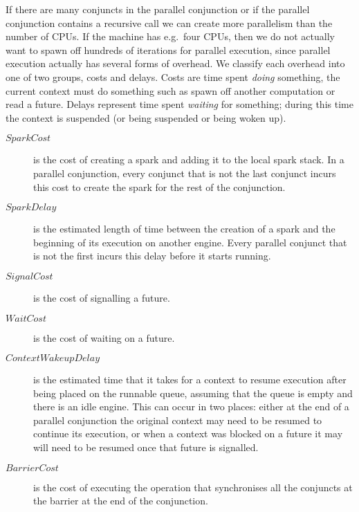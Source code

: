 If there are many conjuncts in the parallel conjunction or if the parallel
conjunction contains a recursive call we can create more parallelism than
the number of CPUs.
If the machine has e.g.\ four CPUs,
then we do not actually want to spawn off
hundreds of iterations for parallel execution,
since parallel execution actually has several forms of overhead.
We classify each overhead into one of two groups, costs and delays.
Costs are time spent \emph{doing} something, the current context must do
something such as spawn off another computation or read a future.
Delays represent time spent \emph{waiting} for something;
during this time the context is suspended (or being suspended or being woken
up).

\begin{description}
\item[$SparkCost$]
is the cost of creating a spark and adding it to the local spark stack.
In a parallel conjunction,
every conjunct that is not the last conjunct incurs this cost
to create the spark for the rest of the conjunction.
\item[$SparkDelay$]
is the estimated length of time between the creation of a spark
and the beginning of its execution on another engine.
Every parallel conjunct that is not the first incurs this delay
before it starts running.
\item[$SignalCost$]
is the cost of signalling a future.
\item[$WaitCost$]
is the cost of waiting on a future.
\item[$ContextWakeupDelay$]
is the estimated time that it takes for a context to resume execution
after being placed on the runnable queue,
assuming that the queue is empty and there is an idle engine.
This can occur in two places:
either at the end of a parallel conjunction the original context may need to
be resumed to continue its execution,
or when a context was blocked on a future it may will need to be resumed
once that future is signalled.
\item[$BarrierCost$]
is the cost of executing the operation
that synchronises all the conjuncts at the barrier
at the end of the conjunction.
\end{description}

